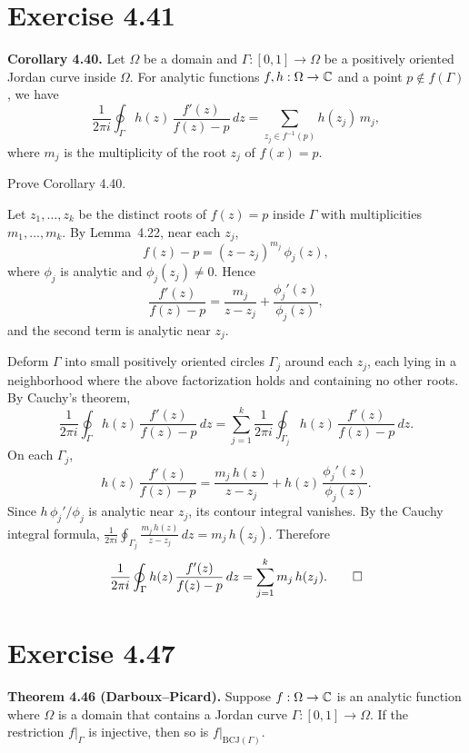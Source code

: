 \documentclass{article}
\begin{document}
\section{Exercise 4.41}

\textbf{Corollary 4.40.}
Let $\Omega$ be a domain and $\Gamma : [0, 1] \to \Omega$ be a
positively oriented Jordan curve inside $\Omega$.  For analytic
functions $f, h : \Omega \to \mathbb{C}$ and a point $p \notin f(\Gamma)$, we
have
\[
  \frac{1}{2\pi i} \oint_\Gamma h(z)\,\frac{f'(z)}{f(z) - p}\,dz
  = \sum_{z_j \in f^{-1}(p)} h(z_j)\,m_j,
\]
where $m_j$ is the multiplicity of the root $z_j$ of $f(x) = p$.

Prove Corollary 4.40.

\begin{solution}
  Let $z_1, \ldots, z_k$ be the distinct roots of $f(z) = p$
  inside $\Gamma$ with multiplicities $m_1, \ldots, m_k$.
  By Lemma~4.22, near each $z_j$,
  \[
    f(z) - p = (z - z_j)^{m_j}\,\phi_j(z),
  \]
  where $\phi_j$ is analytic and $\phi_j(z_j) \ne 0$.
  Hence
  \[
    \frac{f'(z)}{f(z) - p}
    = \frac{m_j}{z - z_j} + \frac{\phi_j'(z)}{\phi_j(z)},
  \]
  and the second term is analytic near $z_j$.

  Deform $\Gamma$ into small positively oriented circles
  $\Gamma_j$ around each $z_j$, each lying in a neighborhood
  where the above factorization holds and containing no other
  roots.  By Cauchy's theorem,
  \[
    \frac{1}{2\pi i}\oint_\Gamma h(z)\,\frac{f'(z)}{f(z)-p}\,dz
    = \sum_{j=1}^{k}
      \frac{1}{2\pi i}\oint_{\Gamma_j}
      h(z)\,\frac{f'(z)}{f(z)-p}\,dz.
  \]
  On each $\Gamma_j$,
  \[
    h(z)\,\frac{f'(z)}{f(z) - p}
    = \frac{m_j\,h(z)}{z - z_j}
    + h(z)\,\frac{\phi_j'(z)}{\phi_j(z)}.
  \]
  Since $h\,\phi_j'/\phi_j$ is analytic near $z_j$,
  its contour integral vanishes.
  By the Cauchy integral formula,
  $\frac{1}{2\pi i}\oint_{\Gamma_j} \frac{m_j\,h(z)}{z - z_j}\,dz
  = m_j\,h(z_j)$.
  Therefore
  \[
    \frac{1}{2\pi i}\oint_\Gamma
    h(z)\,\frac{f'(z)}{f(z) - p}\,dz
    = \sum_{j=1}^{k} m_j\,h(z_j).\qedhere
  \]
\end{solution}

\section{Exercise 4.47}

\textbf{Theorem 4.46 (Darboux--Picard).}
Suppose $f : \Omega \to \mathbb{C}$ is an analytic function where $\Omega$ is
a domain that contains a Jordan curve $\Gamma : [0, 1] \to \Omega$.
If the restriction $f|_\Gamma$ is injective, then so is
$f|_{\mathrm{BCJ}(\Gamma)}$.
\end{document}
